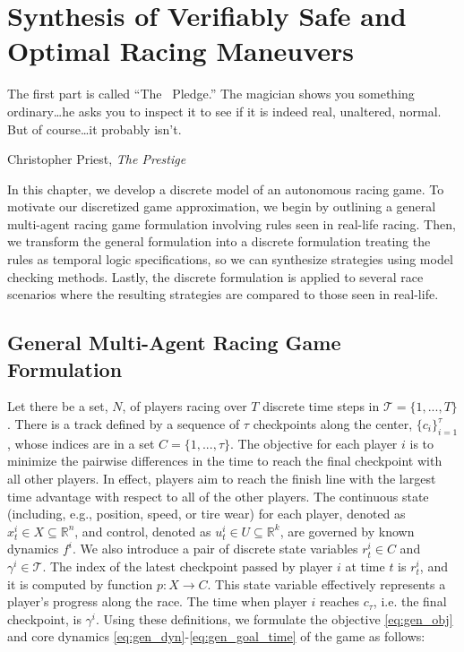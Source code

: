 \chapter{Synthesis of Verifiably Safe and Optimal Racing Maneuvers}
\epigraph{\flushright The first part is called ``The~ Pledge.'' The magician shows you something ordinary\ldots he asks you to inspect it to see if it is indeed real, unaltered, normal. But of course\ldots it probably isn't.}{Christopher Priest, \textit{The Prestige}}
\label{chapter:synthesis}
In this chapter, we develop a discrete model of an autonomous racing game. To motivate our discretized game approximation, we begin by outlining a general multi-agent racing game formulation involving rules seen in real-life racing. Then, we transform the general formulation into a discrete formulation treating the rules as temporal logic specifications, so we can synthesize strategies using model checking methods. Lastly, the discrete formulation is applied to several race scenarios where the resulting strategies are compared to those seen in real-life.

\section{General Multi-Agent Racing Game Formulation} \label{section:genform}
Let there be a set, $N$, of players racing over $T$ discrete time steps in $\mathcal{T} = \{1, ..., T\}$. There is a track defined by a sequence of $\tau$ checkpoints along the center, $\{c_i\}_{i=1}^{\tau}$, whose indices are in a set $C=\{1,..., \tau\}$. The objective for each player $i$ is to minimize the pairwise differences in the time to reach the final checkpoint with all other players. In effect, players aim to reach the finish line with the largest time advantage with respect to all of the other players. The continuous state (including, e.g., position, speed, or tire wear) for each player, denoted as $x^i_t \in X \subseteq \mathbb{R}^n$, and control, denoted as $u^i_t \in U \subseteq \mathbb{R}^k$, are governed by known dynamics $f^i$. We also introduce a pair of discrete state variables $r^i_t \in C$ and $\gamma^i \in \mathcal{T}$. The index of the latest checkpoint passed by player $i$ at time $t$ is $r^i_t$, and it is computed by function $p: X\rightarrow C$. This state variable effectively represents a player's progress along the race. The time when player $i$ reaches $c_\tau$, i.e. the final checkpoint, is $\gamma^i$. Using these definitions, we formulate the objective \eqref{eq:gen_obj} and core dynamics \eqref{eq:gen_dyn}-\eqref{eq:gen_goal_time} of the game as follows:

